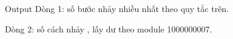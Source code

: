 Output
Dòng 1: số bước nhảy nhiều nhất theo quy tắc trên.   


   Dòng 2: số cách nhảy , lấy dư theo module 1000000007.